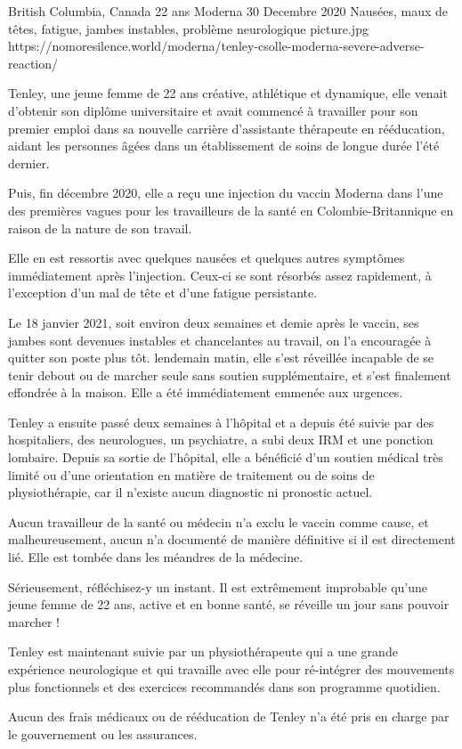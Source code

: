 {British Columbia, Canada}
{22 ans}
{Moderna}
{30 Decembre 2020}
{Nausées, maux de têtes, fatigue, jambes instables, problème neurologique}
{picture.jpg}
{https://nomoresilence.world/moderna/tenley-csolle-moderna-severe-adverse-reaction/}
{

Tenley, une jeune femme de 22 ans créative, athlétique et dynamique, elle venait
d'obtenir son diplôme universitaire et avait commencé à travailler pour son
premier emploi dans sa nouvelle carrière d'assistante thérapeute en rééducation,
aidant les personnes âgées dans un établissement de soins de longue durée l'été
dernier.

Puis, fin décembre 2020, elle a reçu une injection du vaccin Moderna dans l'une
des premières vagues pour les travailleurs de la santé en Colombie-Britannique
en raison de la nature de son travail.

Elle en est ressortis avec quelques nausées et quelques autres symptômes
immédiatement après l'injection. Ceux-ci se sont résorbés assez rapidement, à
l'exception d'un mal de tête et d'une fatigue persistante.

Le 18 janvier 2021, soit environ deux semaines et demie après le vaccin, ses
jambes sont devenues instables et chancelantes au travail, on l'a encouragée à
quitter son poste plus tôt. lendemain matin, elle s'est réveillée incapable de
se tenir debout ou de marcher seule sans soutien supplémentaire, et s'est
finalement effondrée à la maison. Elle a été immédiatement emmenée aux urgences.

Tenley a ensuite passé deux semaines à l'hôpital et a depuis été suivie par des
hospitaliers, des neurologues, un psychiatre, a subi deux IRM et une ponction
lombaire. Depuis sa sortie de l'hôpital, elle a bénéficié d'un soutien médical
très limité ou d'une orientation en matière de traitement ou de soins de
physiothérapie, car il n'existe aucun diagnostic ni pronostic actuel.

Aucun travailleur de la santé ou médecin n'a exclu le vaccin comme cause, et
malheureusement, aucun n'a documenté de manière définitive si il est directement
lié. Elle est tombée dans les méandres de la médecine.

Sérieusement, réfléchisez-y un instant. Il est extrêmement improbable qu'une
jeune femme de 22 ans, active et en bonne santé, se réveille un jour sans
pouvoir marcher !

Tenley est maintenant suivie par un physiothérapeute qui a une grande expérience
neurologique et qui travaille avec elle pour ré-intégrer des mouvements plus
fonctionnels et des exercices recommandés dans son programme quotidien.

Aucun des frais médicaux ou de rééducation de Tenley n'a été pris en charge par
le gouvernement ou les assurances.

}
